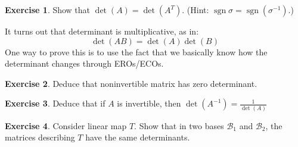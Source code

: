 \documentclass[12pt, a4paper]{article}
\DeclareMathOperator{\sgn}{sgn}
\theoremstyle{remark}
\theoremstyle{definition}
\newtheorem{exercise}{Exercise}
\numberwithin{equation}{section}
\numberwithin{definition}{section}
\numberwithin{example}{section}
\numberwithin{exercise}{section}
\numberwithin{remark}{section}
\numberwithin{figure}{section}
\begin{document}
\begin{exercise}
    Show that $\det (A) = \det \left( A^T \right)$.
    (Hint: $\sgn{\sigma} = \sgn{\left( \sigma^{-1} \right)}$.)
\end{exercise}
It turns out that determinant is multiplicative, as in:
\begin{equation*}
    \det \left( AB \right) = \det \left( A \right) \det \left( B \right)
\end{equation*}
One way to prove this is to use the fact that we basically know
how the determinant changes through EROs/ECOs.
\begin{exercise}
    Deduce that noninvertible matrix has zero determinant.
\end{exercise}
\begin{exercise}
    Deduce that if $A$ is invertible, then $\det \left( A^{-1} \right) = \frac{1}{\det \left( A \right)}$
\end{exercise}
\begin{exercise}
    Consider linear map $T$. Show that in two bases $\mathcal{B}_1$ and $\mathcal{B}_2$,
    the matrices describing $T$ have the same determinants.
\end{exercise}
\end{document}
